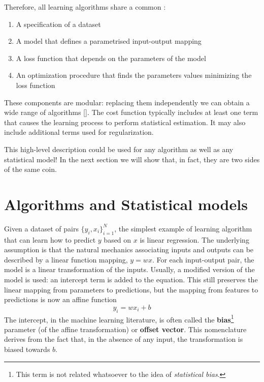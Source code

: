 Therefore, all learning algorithms share a common :
\begin{enumerate}
    \item A specification of a dataset
    \item A model that defines a parametrised input-output mapping 
    \item A loss function that depends on the parameters of the model 
    \item An optimization procedure that finds the parameters values minimizing the loss function
\end{enumerate}
These components are modular: replacing them independently we can obtain a wide range of algorithms [\cite{Goodfellow-et-al-2016}]. The cost function typically includes at least one term that causes the learning process to perform statistical estimation. It may also include additional terms used for regularization.

This high-level description could be used for any algorithm as well as any statistical model! In the next section we will show that, in fact, they are two sides of the same coin. 





\section{Algorithms and Statistical models}
Given a dataset of pairs $\{y_i, x_i\}_{i=1}^{N}$, the simplest example of learning algorithm that can learn how to predict $y$ based on $x$ is linear regression. The underlying assumption is that the natural mechanics associating inputs and outputs can be described by a linear function mapping, $y = wx$. For each input-output pair, the model is a linear transformation of the inputs. Usually, a modified version of the model is used: an intercept term is added to the equation. This still preserves the linear mapping from parameters to predictions, but the mapping from features to predictions is now an affine function
$$y_i = w x_i + b$$
The intercept, in the machine learning literature, is often called the \textbf{bias}\footnote{This term is not related whatsoever to the idea of \textit{statistical bias}.} parameter (of the affine transformation) or \textbf{offset vector}. This nomenclature derives from the fact that, in the absence of any input, the transformation is biased towards $b$. 

